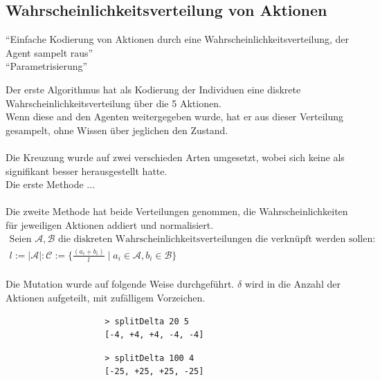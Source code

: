         \subsection{Wahrscheinlichkeitsverteilung von Aktionen}
            ``Einfache Kodierung von Aktionen durch eine Wahrscheinlichkeitsverteilung, der Agent sampelt raus''\\
            ``Parametrisierung''

            Der erste Algorithmus hat als Kodierung der Individuen eine diskrete Wahrscheinlichkeitsverteilung über die 5 Aktionen. \\
            Wenn diese and den Agenten weitergegeben wurde, hat er aus dieser Verteilung gesampelt, ohne Wissen über jeglichen den Zustand. \\
            \\

            Die Kreuzung wurde auf zwei verschieden Arten umgesetzt, wobei sich keine als signifikant besser herausgestellt hatte.\\
            Die erste Methode ...\\
            \\
            Die zweite Methode hat beide Verteilungen genommen, die Wahrscheinlichkeiten für jeweiligen Aktionen addiert und normalisiert.\\

            \begin{align*}
                \text{Seien } \mathcal{A, B} \text{ die diskreten Wahrscheinlichkeitsverteilungen die verknüpft werden sollen:}\\
                    l := |\mathcal{A}|: \mathcal{C} := \{ \frac{(a_i + b_i)}{l} \; | \; a_i \in \mathcal{A}, b_i \in \mathcal{B}\}
            \end{align*}
            \\
            Die Mutation wurde auf folgende Weise durchgeführt. $\delta$ wird in die Anzahl der Aktionen aufgeteilt, mit zufälligem Vorzeichen. 
            \begin{multicols}{2}
                \begin{verbatim}
                    > splitDelta 20 5
                    [-4, +4, +4, -4, -4]
                \end{verbatim} \par
                \begin{verbatim}
                    > splitDelta 100 4
                    [-25, +25, +25, -25]
                \end{verbatim} \par
            \end{multicols}

